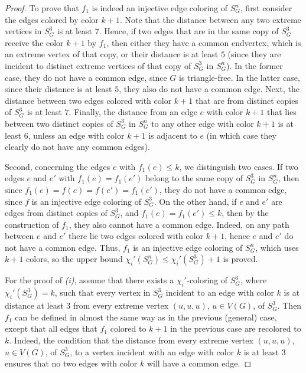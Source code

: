 \documentclass[10pt,a4paper]{amsart}
\begin{document}
\begin{proof}
To prove that $f_1$ is indeed an injective edge coloring of $S_G^n$, first consider the edges colored by color $k+1$. Note that the distance between any two extreme vertices in $S_G^3$ is at least $7$. Hence, if two edges that are in the same copy of $S_G^3$ receive the color $k+1$ by $f_1$, then either they have a common endvertex, which is an extreme vertex of that copy, or their distance is at least $5$ (since they are incident to distinct extreme vertices of that copy of $S_G^3$ in $S_G^n$). In the former case, they do not have a common edge, since $G$ is triangle-free. In the latter case, since their distance is at least $5$, they also do not have a common edge.  
Next, the distance between two edges colored with color $k+1$ that are from distinct copies of $S_G^3$ is at least $7$. Finally, the distance from an edge $e$ with color $k+1$ that lies between two distinct copies of $S_G^3$ in $S_G^n$ to any other edge with color $k+1$ is at least $6$, unless an edge with color $k+1$ is adjacent to $e$ (in which case they clearly do not have any common edges). 

Second, concerning the edges $e$ with $f_1(e)\le k$, we distinguish two cases. If two edges $e$ and $e'$ with $f_1(e)=f_1(e')$ belong to the same copy of $S_G^3$ in $S_G^n$, then since $f_1(e)=f(e)=f(e')=f_1(e')$, they do not have a common edge, since $f$ is an injective edge coloring of $S_G^3$. On the other hand, if $e$ and $e'$ are edges from distinct copies of $S_G^3$, and $f_1(e)=f_1(e')\le k$, then by the construction of $f_1$, they also cannot have a common edge. Indeed, on any path between $e$ and $e'$ there lie two edges colored with color $k+1$, hence $e$ and $e'$ do not have a common edge. Thus, $f_1$ is an injective edge coloring of $S_G^n$, which uses $k+1$ colors, so the upper bound $\chi_i'(S_G^n)\le \chi_i'(S_G^3)+1$ is proved. 

For the proof of {\it (i)}, assume that there exists a $\chi_i'$-coloring of $S_G^3$, where $\chi_i'(S_G^3)=k$, such that every vertex in $S_G^3$ incident to an edge with color $k$ is at distance at least $3$ from every extreme vertex $(u,u,u)$, $u\in V(G)$, of $S_G^3$. Then $f_1$ can be defined in almost the same way as in the previous (general) case, except that all edges that $f_1$ colored to $k+1$ in the previous case are recolored to $k$. Indeed, the condition that the distance from every extreme vertex $(u,u,u)$, $u\in V(G)$, of $S_G^3$, to a vertex incident with an edge with color $k$ is at least $3$ ensures that no two edges with color $k$ will have a common edge.


\end{proof}
\end{document}
